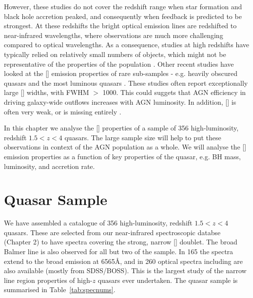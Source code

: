 However, these studies do not cover the redshift range when star formation and black hole accretion peaked, and consequently when feedback is predicted to be strongest. 
At these redshifts the bright optical emission lines are redshifted to near-infrared wavelengths, where observations are much more challenging compared to optical wavelengths. 
As a consequence, studies at high redshifts have typically relied on relatively small numbers of objects, which might not be representative of the properties of the population \citep[e.g.][]{netzer04,sulentic04,shen16a}.
Other recent studies have looked at the [] emission properties of rare sub-samples - e.g. heavily obscured quasars \citep{zakamska16} and the most luminous quasars \citep{bischetti16}. 
These studies often report exceptionally large [] widths, with FWHM $>$ 1000\kms \citep[e.g.][]{netzer04,nesvadba08,kim13,brusa15,carniani15,perna15,bischetti16}. 
This could suggets that AGN efficiency in driving galaxy-wide outflows increases with AGN luminosity. 
In addition, [] is often very weak, or is missing entirely \citep[e.g.][]{netzer04}. 

In this chapter we analyse the [] properties of a sample of 356 high-luminosity, redshift $1.5 < z < 4$ quasars. 
The large sample size will help to put these observations in context of the AGN population as a whole.
We will analyse the [] emission properties as a function of key properties of the quasar, e.g. BH mass, luminosity, and accretion rate. 

\section{Quasar Sample}

We have assembled a catalogue of 356 high-luminosity, redshift $1.5 < z < 4$ quasars.
These are selected from our near-infrared spectroscopic databse (Chapter 2) to have spectra covering the strong, narrow [] doublet. 
The broad Balmer \hb line is also observed for all but two of the sample. 
In 165 the spectra extend to the broad \ha emission at 6565\AA, and in 260 optical spectra including  are also available (mostly from SDSS/BOSS). 
This is the largest study of the narrow line region properties of high-$z$ quasars ever undertaken. 
The quasar sample is summarised in Table~\ref{tab:specnums}.

